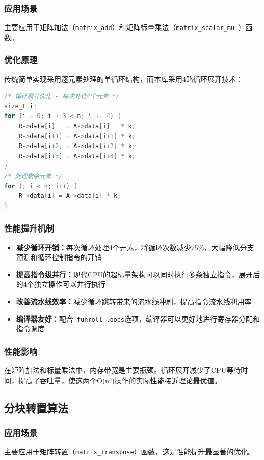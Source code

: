 \documentclass[12pt,a4paper]{article}
\begin{document}
\subsubsection{应用场景}
主要应用于矩阵加法（\texttt{matrix\_add}）和矩阵标量乘法（\texttt{matrix\_scalar\_mul}）函数。

\subsubsection{优化原理}
传统简单实现采用逐元素处理的单循环结构，而本库采用4路循环展开技术：

\begin{lstlisting}[language=c]
/* 循环展开优化 - 每次处理4个元素 */
size_t i;
for (i = 0; i + 3 < n; i += 4) {
    R->data[i]   = A->data[i]   * k;
    R->data[i+1] = A->data[i+1] * k;
    R->data[i+2] = A->data[i+2] * k;
    R->data[i+3] = A->data[i+3] * k;
}
/* 处理剩余元素 */
for (; i < n; i++) {
    R->data[i] = A->data[i] * k;
}
\end{lstlisting}

\subsubsection{性能提升机制}
\begin{itemize}
    \item \textbf{减少循环开销：}每次循环处理4个元素，将循环次数减少75\%，大幅降低分支预测和循环控制指令的开销
    \item \textbf{提高指令级并行：}现代CPU的超标量架构可以同时执行多条独立指令，展开后的4个独立操作可以并行执行
    \item \textbf{改善流水线效率：}减少循环跳转带来的流水线冲刷，提高指令流水线利用率
    \item \textbf{编译器友好：}配合\texttt{-funroll-loops}选项，编译器可以更好地进行寄存器分配和指令调度
\end{itemize}

\subsubsection{性能影响}
在矩阵加法和标量乘法中，内存带宽是主要瓶颈。循环展开减少了CPU等待时间，提高了吞吐量，使这两个O(n²)操作的实际性能接近理论最优值。

\subsection{分块转置算法}

\subsubsection{应用场景}
主要应用于矩阵转置（\texttt{matrix\_transpose}）函数，这是性能提升最显著的优化。
\end{document}
